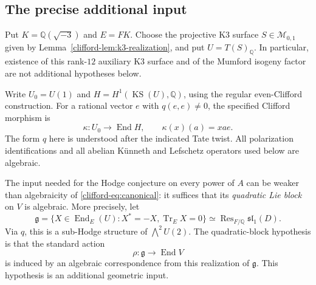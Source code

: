 \documentclass[11pt]{article}
\theoremstyle{definition}
\theoremstyle{remark}
\begin{document}
\subsection{The precise additional input}

Put $K=\mathbb Q(\sqrt{-3})$ and $E=FK$.  Choose the projective K3
surface $S\in\mathcal M_{0,1}$ given by
Lemma~\ref{clifford-lem:k3-realization}, and put $U=T(S)_{\mathbb Q}$.
In particular, existence of this rank-$12$ auxiliary K3 surface and
of the Mumford isogeny factor are not additional hypotheses below.

Write $U_0=U(1)$ and $H=H^1(\operatorname{KS}(U),\mathbb Q)$, using the
regular even-Clifford construction.  For a rational vector $e$ with
$q(e,e)\ne0$, the specified Clifford morphism is
\begin{equation}\label{clifford-eq:canonical}
 \kappa:U_0\longrightarrow\operatorname{End}H,
 \qquad \kappa(x)(a)=xae.
\end{equation}
The form $q$ here is understood after the indicated Tate twist.  All
polarization identifications and all abelian K\"unneth and Lefschetz
operators used below are algebraic.

The input needed for the Hodge conjecture on every power of $A$ can be
weaker than algebraicity
of \eqref{clifford-eq:canonical}: it suffices that its \emph{quadratic Lie block}
on $V$ is algebraic.  More precisely, let
\[
 \mathfrak g=\{X\in\operatorname{End}_E(U):X^*=-X,
                  \operatorname{Tr}_E X=0\}
 \simeq\operatorname{Res}_{F/\mathbb Q}\mathfrak{sl}_1(D).
\]
Via $q$, this is a sub-Hodge structure of $\bigwedge^2U(2)$.
The quadratic-block hypothesis is that the standard action
\begin{equation}\label{clifford-eq:lie-block}
 \rho:\mathfrak g\longrightarrow\operatorname{End}V
\end{equation}
is induced by an algebraic correspondence from this realization of
$\mathfrak g$.  This hypothesis is an additional geometric input.
\end{document}
